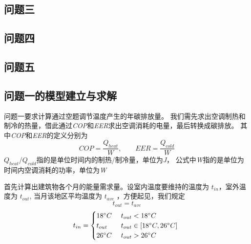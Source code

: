 \documentclass[a4paper, 12pt]{article}
\numberwithin{equation}{section}
\begin{document}
        \subsection{问题三}

        \subsection{问题四}

        \subsection{问题五}


    {}


    {}


    {}
        \subsection{问题一的模型建立与求解}
            问题一要求计算通过空题调节温度产生的年碳排放量。
            我们需先求出空调制热和制冷的热量，借此通过\textit{COP}和\textit{EER}求出空调消耗的电量，最后转换成碳排放。
            其中\textit{COP}和\textit{EER}的定义分别为
            \begin{equation}
                COP = \frac{Q_{heat}}{W},\hspace{2em} EER = \frac{Q_{cold}}{W}
            \end{equation}
            $ Q_{heat} / Q_{cold} $指的是单位时间内的制热/制冷量，单位为\textit{J}，
            公式中\textit{W}指的是单位为时间内空调消耗的功率，单位为\textit{W}

            首先计算出建筑物各个月的能量需求量。设室内温度要维持的温度为 $ t_{in} $，室外温度为 $ t_{out} $,
            当月该地区平均温度为 $ t_{ave} $ ，方便起见，我们规定
            \begin{equation*}
                t_{out} = t_{ave}
            \end{equation*}
            \begin{equation*}
                t_{in} =
                \begin{cases}
                    18 ^{\circ}C & \text{ $ t_{out} < 18 ^{\circ}C $ } \\
                    t_{out} & \text{ $ t_{out} \in [18 ^{\circ}C, 26 ^{\circ}C] $ } \\
                    26 ^{\circ}C & \text{ $ t_{out} > 26 ^{\circ}C $}
                \end{cases}
            \end{equation*}
\end{document}
